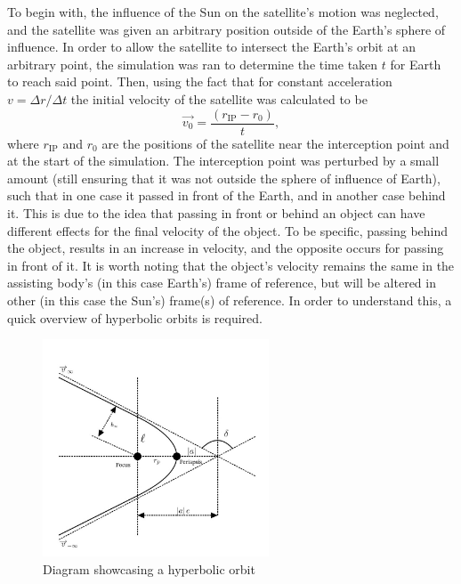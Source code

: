 \documentclass[11pt, english]{report}
\begin{document}
{To begin with, the influence of the Sun on the satellite's motion was neglected, and the satellite was given an arbitrary position outside of the Earth's sphere of influence. In order to allow the satellite to intersect the Earth's orbit at an arbitrary point, the simulation was ran to determine the time taken $t$ for Earth to reach said point. Then, using the fact that for constant acceleration $v = \Delta r / \Delta t$ \cite{newton_principia_1999} the initial velocity of the satellite was calculated to be 
\begin{equation}
    \vec{v_0} = \frac{(r_{\mathrm{IP}} - r_0)}{t},
\end{equation}
where $r_{\mathrm{IP}}$ and $r_0$ are the positions of the satellite near the interception point and at the start of the simulation. The interception point was perturbed by a small amount (still ensuring that it was not outside the sphere of influence of Earth), such that in one case it passed in front of the Earth, and in another case behind it. This is due to the idea that passing in front or behind an object can have different effects for the final velocity of the object. To be specific, passing behind the object, results in an increase in velocity, and the opposite occurs for passing in front of it. It is worth noting that the object's velocity remains the same in the assisting body's (in this case Earth's) frame of reference, but will be altered in other (in this case the Sun's) frame(s) of reference. In order to understand this, a quick overview of hyperbolic orbits is required.
\begin{figure}[ht]
    \centering
    \includegraphics[width=0.6\textwidth]{graphics/Orbits.jpg}
    \caption{Diagram showcasing a hyperbolic orbit}
    \label{fig:hyp_orbit}
\end{figure}

}
\end{document}
